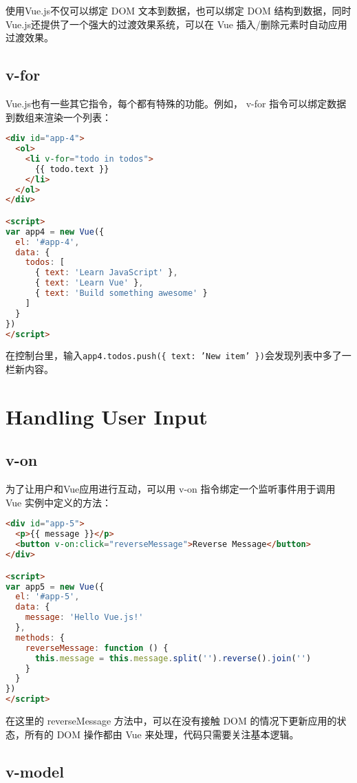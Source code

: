 使用Vue.js不仅可以绑定 DOM 文本到数据，也可以绑定 DOM 结构到数据，同时Vue.js还提供了一个强大的过渡效果系统，可以在 Vue 插入/删除元素时自动应用过渡效果。

\subsection{v-for}

Vue.js也有一些其它指令，每个都有特殊的功能。例如， v-for 指令可以绑定数据到数组来渲染一个列表：

\begin{lstlisting}[language=HTML]
<div id="app-4">
  <ol>
    <li v-for="todo in todos">
      {{ todo.text }}
    </li>
  </ol>
</div>

<script>
var app4 = new Vue({
  el: '#app-4',
  data: {
    todos: [
      { text: 'Learn JavaScript' },
      { text: 'Learn Vue' },
      { text: 'Build something awesome' }
    ]
  }
})
</script>
\end{lstlisting}

在控制台里，输入\texttt{app4.todos.push(\{ text: 'New item' \})}会发现列表中多了一栏新内容。

\section{Handling User Input}


\subsection{v-on}


为了让用户和Vue应用进行互动，可以用 v-on 指令绑定一个监听事件用于调用 Vue 实例中定义的方法：

\begin{lstlisting}[language=HTML]
<div id="app-5">
  <p>{{ message }}</p>
  <button v-on:click="reverseMessage">Reverse Message</button>
</div>

<script>
var app5 = new Vue({
  el: '#app-5',
  data: {
    message: 'Hello Vue.js!'
  },
  methods: {
    reverseMessage: function () {
      this.message = this.message.split('').reverse().join('')
    }
  }
})
</script>
\end{lstlisting}

在这里的 reverseMessage 方法中，可以在没有接触 DOM 的情况下更新应用的状态，所有的 DOM 操作都由 Vue 来处理，代码只需要关注基本逻辑。


\subsection{v-model}


